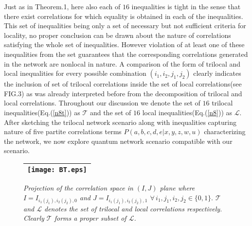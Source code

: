 \documentclass[pra,10pt,twocolumn,superscriptaddress,floatfix,showpacs]{revtex4-1}
\begin{document}
Just as in Theorem.1, here also each of $16$ inequalities is tight in the sense that there exist correlations for which equality is obtained in each of the inequalities. This set of inequalities being only a set of necessary but not sufficient criteria for locality, no proper conclusion can be drawn about the nature of correlations satisfying the whole set of inequalities. However violation of at least one of these inequalities from the set guarantees that the corresponding correlations generated in the network are nonlocal in nature. A comparison of the form of trilocal and local inequalities for every possible combination $(i_1,i_2,j_1,j_2)$ clearly indicates the inclusion of set of trilocal correlations inside the set of local correlations(see FIG.3) as was already interpreted before from the decomposition of trilocal and local correlations. Throughout our discussion we denote the set of $16$ trilocal inequalities(Eq.(\ref{n8t})) as $\mathcal{T}$ and the set of $16$ local inequalities(Eq.(\ref{n8})) as $\mathcal{L}$. \\
After sketching the trilocal network scenario along with inequalities capturing nature of five partite correlations terms $P(a,b,c,d,e|x,y,z,w,u)$ characterizing the network, we now explore quantum network scenario compatible with our scenario.\\
\begin{figure}[htb]
\begin{tabular}{|c|}
\hline
\texttt{[image: BT.eps]}\\
\hline
\end{tabular}
\caption{\emph{Projection of the  correlation space in $(I,J)$ plane where $I=I_{i_1(j_1),i_2(j_2),0}$ and $J=I_{i_1(j_1),i_2(j_2),1}$ $\forall\,i_1,j_1,i_2,j_2\in\{0,1\}.$ $\mathcal{T}$ and $\mathcal{L} $ denotes the set of trilocal and local correlations respectively. Clearly $\mathcal{T}$ forms a proper subset of $\mathcal{L}$.}}
\end{figure}
\end{document}
